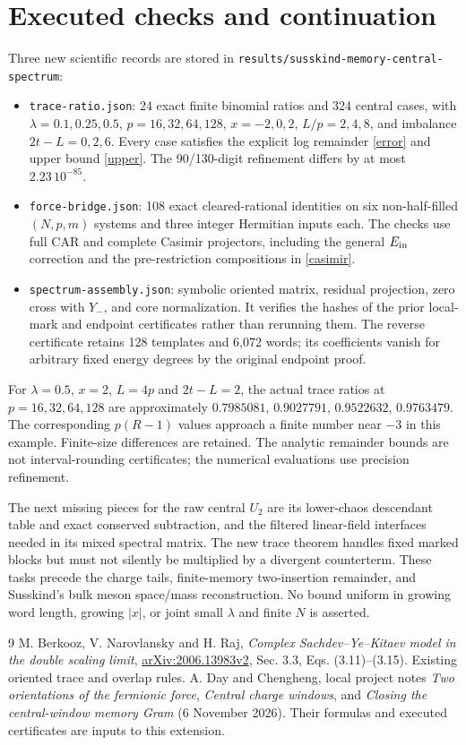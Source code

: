\documentclass[11pt,a4paper]{article}
\begin{document}
\section{Executed checks and continuation}
Three new scientific records are stored in
\texttt{results/susskind-memory-central-spectrum}:
\begin{itemize}
 \item \texttt{trace-ratio.json}: 24 exact finite binomial ratios
 and 324 central cases, with $\lambda=0.1,0.25,0.5$,
 $p=16,32,64,128$, $x=-2,0,2$, $L/p=2,4,8$, and imbalance
 $2t-L=0,2,6$. Every case satisfies the explicit log remainder
 \eqref{error} and upper bound \eqref{upper}. The 90/130-digit
 refinement differs by at most $2.23\,10^{-85}$.
 \item \texttt{force-bridge.json}: 108 exact cleared-rational
 identities on six non-half-filled $(N,p,m)$ systems and three
 integer Hermitian inputs each. The checks use full CAR and
 complete Casimir projectors, including the general $E_{\rm in}$
 correction and the pre-restriction compositions in \eqref{casimir}.
 \item \texttt{spectrum-assembly.json}: symbolic oriented matrix,
 residual projection, zero cross with $Y_-$, and core normalization.
 It verifies the hashes of the prior local-mark and endpoint
 certificates rather than rerunning them. The reverse certificate
 retains 128 templates and 6,072 words; its coefficients vanish
 for arbitrary fixed energy degrees by the original endpoint proof.
\end{itemize}
For $\lambda=0.5$, $x=2$, $L=4p$ and $2t-L=2$, the actual trace
ratios at $p=16,32,64,128$ are approximately
$0.7985081$, $0.9027791$, $0.9522632$, $0.9763479$.
The corresponding $p(R-1)$ values approach a finite number near
$-3$ in this example. Finite-size differences are retained.
The analytic remainder bounds are not interval-rounding certificates;
the numerical evaluations use precision refinement.

The next missing pieces for the raw central $U_2$ are its lower-chaos
descendant table and exact conserved subtraction, and the filtered
linear-field interfaces needed in its mixed spectral matrix.
The new trace theorem handles fixed marked blocks but must not
silently be multiplied by a divergent counterterm. These tasks
precede the charge tails, finite-memory two-insertion remainder,
and Susskind's bulk meson space/mass reconstruction.
No bound uniform in growing word length, growing $|x|$, or joint
small $\lambda$ and finite $N$ is asserted.

\begin{thebibliography}{9}\small
{} M. Berkooz, V. Narovlansky and H. Raj,
\emph{Complex Sachdev--Ye--Kitaev model in the double scaling limit},
\href{https://arxiv.org/html/2006.13983v2}{arXiv:2006.13983v2},
Sec. 3.3, Eqs. (3.11)--(3.15). Existing oriented trace and overlap rules.
 A. Day and Chengheng, local project notes
\emph{Two orientations of the fermionic force},
\emph{Central charge windows}, and
\emph{Closing the central-window memory Gram} (6 November 2026).
Their formulas and executed certificates are inputs to this extension.
\end{thebibliography}
\end{document}
